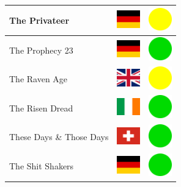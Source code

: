 \documentclass[12pt, a4paper, twoside]{report}
\begin{document}
\begin{center}
\begin{longtable}{|p{5cm}|p{2cm}|p{2cm}|}
 The Privateer                                              & \includegraphics[width=1cm]{../img/flags/de} &   \includegraphics[width=1cm]{../likes/m} \\ \hline
 The Prophecy 23                                            & \includegraphics[width=1cm]{../img/flags/de} &   \includegraphics[width=1cm]{../likes/y} \\ \hline
 The Raven Age                                              & \includegraphics[width=1cm]{../img/flags/gb} &   \includegraphics[width=1cm]{../likes/m} \\ \hline
 The Risen Dread                                            & \includegraphics[width=1cm]{../img/flags/ie} &   \includegraphics[width=1cm]{../likes/y} \\ \hline
 These Days \& Those Days                                   & \includegraphics[width=1cm]{../img/flags/ch} &   \includegraphics[width=1cm]{../likes/y} \\ \hline
 The Shit Shakers                                           & \includegraphics[width=1cm]{../img/flags/de} &   \includegraphics[width=1cm]{../likes/y} \\ \hline

\end{longtable}
\end{center}
\end{document}
